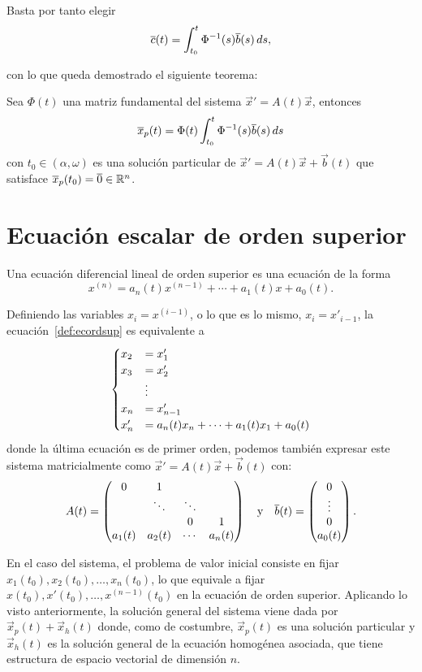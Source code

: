 \documentclass[../ecuaciones_diferenciales.tex]{subfiles}
\begin{document}
Basta por tanto elegir
\[\overline{c}(t) = \int_{t_0}^t \Phi^{-1}(s) \overline{b}(s) \mathop{d\!} s,\]

con lo que queda demostrado el siguiente teorema:

\begin{theorem}
	Sea \(\Phi(t)\) una matriz fundamental del sistema
	\(\vec{x}' = A(t)\vec{x}\), entonces
	\[\overline{x}_p(t) = \Phi(t) \int_{t_0}^t \Phi^{-1}(s) \overline{b}(s) \mathop{d\!} s\]
	con \(t_0 \in (\alpha, \omega)\) es una solución particular de
	\(\vec{x}' = A(t)\vec{x} + \vec{b}(t)\) que satisface
	\(\overline{x}_p(t_0) = \overline{0} \in \mathbb{R}^n\).
\end{theorem}

\section{Ecuación escalar de orden superior}

\begin{definition}
	\label{def:ecordsup}
	Una ecuación diferencial lineal de orden superior es una ecuación de la
	forma
	\[x^{(n)} = a_n(t) x^{(n - 1)} + \cdots + a_1(t)x + a_0(t).\]
\end{definition}

Definiendo las variables \(x_i = x^{(i - 1)}\), o lo que es lo mismo,
\(x_i = x'_{i - 1}\), la ecuación~\ref{def:ecordsup} es equivalente a
\[\begin{cases}
	x_2 &= x'_1 \\
	x_3 &= x'_2 \\
	&\vdots \\
	x_n &= x'_{n - 1} \\
	x'_n &= a_n(t) x_n + \cdots + a_1(t) x_1 + a_0(t)
	\end{cases}\]
donde la última ecuación es de primer orden, podemos también expresar este
sistema matricialmente como \(\vec{x}' = A(t)\vec{x} + \vec{b}(t)\) con:
\[A(t) = \begin{pmatrix}
		0 & 1 & & \\
		& \ddots & \ddots & \\
		& & 0 & 1 \\
		a_1(t) & a_2(t) & \cdots & a_n(t)
	\end{pmatrix}
	\quad \text{y} \quad
	\overline{b}(t) = \begin{pmatrix}0 \\ \vdots \\ 0 \\ a_0(t)\end{pmatrix}.
\]

En el caso del sistema, el problema de valor inicial consiste en fijar
\(x_1(t_0), x_2(t_0), \dots, x_n(t_0)\), lo que equivale a fijar
\(x(t_0), x'(t_0), \dots, x^{(n-1)}(t_0)\) en la ecuación de orden superior.
Aplicando lo visto anteriormente, la solución general del sistema viene dada por
\(\vec{x}_p(t) + \vec{x}_h(t)\) donde, como de costumbre, \(\vec{x}_p(t)\) es
una solución particular y \(\vec{x}_h(t)\) es la solución general de la ecuación
homogénea asociada, que tiene estructura de espacio vectorial de dimensión \(n\).
\end{document}

